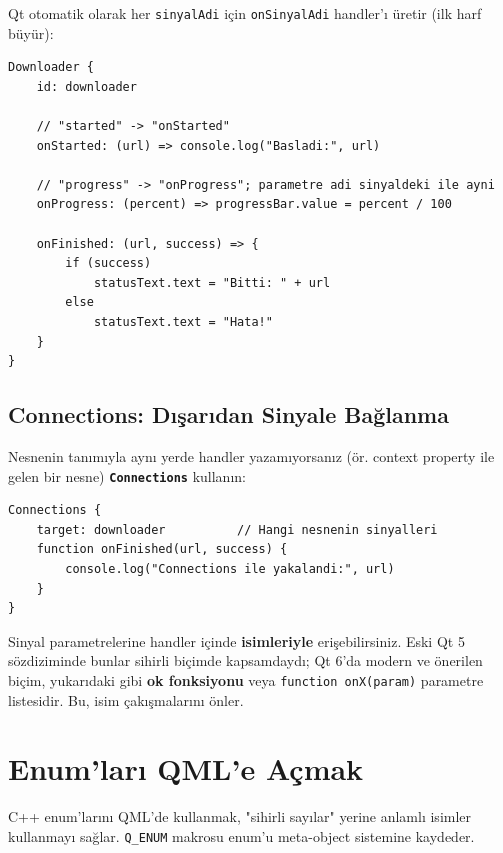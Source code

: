 \documentclass[11pt,a4paper]{article}
\newcommand{\kls}[1]{\texttt{\color{anaMavi}\textbf{#1}}}
\newcommand{\kod}[1]{\texttt{\color{koyuGri}#1}}
\begin{document}
Qt otomatik olarak her \kod{sinyalAdi} için \kod{onSinyalAdi} handler'ı üretir
(ilk harf büyür):

\begin{lstlisting}[style=qmlstyle]
Downloader {
    id: downloader

    // "started" -> "onStarted"
    onStarted: (url) => console.log("Basladi:", url)

    // "progress" -> "onProgress"; parametre adi sinyaldeki ile ayni
    onProgress: (percent) => progressBar.value = percent / 100

    onFinished: (url, success) => {
        if (success)
            statusText.text = "Bitti: " + url
        else
            statusText.text = "Hata!"
    }
}
\end{lstlisting}

\subsection{Connections: Dışarıdan Sinyale Bağlanma}

Nesnenin tanımıyla aynı yerde handler yazamıyorsanız (ör. context property ile
gelen bir nesne) \kls{Connections} kullanın:

\begin{lstlisting}[style=qmlstyle]
Connections {
    target: downloader          // Hangi nesnenin sinyalleri
    function onFinished(url, success) {
        console.log("Connections ile yakalandi:", url)
    }
}
\end{lstlisting}

\begin{ipucukutu}
Sinyal parametrelerine handler içinde \textbf{isimleriyle} erişebilirsiniz. Eski
Qt 5 sözdiziminde bunlar sihirli biçimde kapsamdaydı; Qt 6'da modern ve önerilen
biçim, yukarıdaki gibi \textbf{ok fonksiyonu} veya \kod{function onX(param)}
parametre listesidir. Bu, isim çakışmalarını önler.
\end{ipucukutu}

\section{Enum'ları QML'e Açmak}

C++ enum'larını QML'de kullanmak, "sihirli sayılar" yerine anlamlı isimler
kullanmayı sağlar. \kod{Q\_ENUM} makrosu enum'u meta-object sistemine kaydeder.
\end{document}
